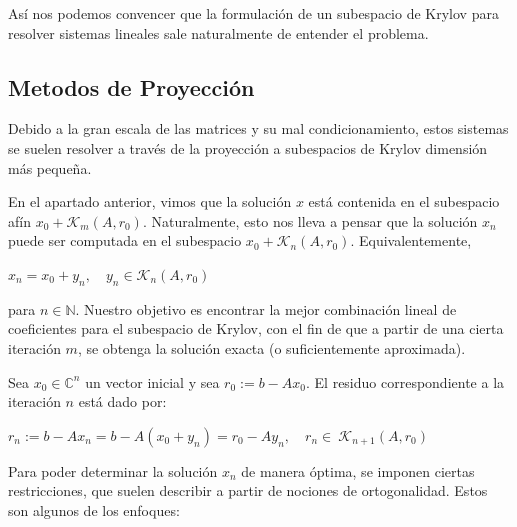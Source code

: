 \documentclass[12pt, oneside]{book}
\begin{document}
Así nos podemos convencer que la formulación de un subespacio de Krylov para resolver sistemas lineales sale naturalmente de entender el problema.

\subsection{Metodos de Proyección}

Debido a la gran escala de las matrices y su mal condicionamiento, estos sistemas se suelen resolver a través de la proyección a subespacios de Krylov dimensión más pequeña. 

En el apartado anterior, vimos que la solución $x$ está contenida en el subespacio afín $x_0 + \mathcal{K}_m(A, r_0)$. Naturalmente, esto nos lleva a pensar que la solución $x_n$ puede ser computada en el subespacio $x_0 + \mathcal{K}_n(A, r_0)$. Equivalentemente,
\begin{center}
	$x_n = x_0 + y_n, \quad  y_n \in \mathcal{K}_n(A, r_0)$
\end{center}
para $n \in \mathbb{N}$. Nuestro objetivo es encontrar la mejor combinación lineal de coeficientes para el subespacio de Krylov, con el fin de que a partir de una cierta iteración $m$, se obtenga la solución exacta (o suficientemente aproximada).

Sea $x_0 \in \mathbb{C}^n$ un vector inicial y sea $r_0 := b - Ax_0$. El residuo correspondiente a la iteración $n$ está dado por:
\begin{center}
	$r_n := b - Ax_n = b - A(x_0 + y_n) = r_0 - Ay_n, \quad r_n\in \ \mathcal{K}_{n+1}(A, r_0)$
\end{center}
Para poder determinar la solución $x_n$ de manera óptima, se imponen ciertas restricciones, que suelen describir a partir de nociones de ortogonalidad. Estos son algunos de los enfoques:
\end{document}
